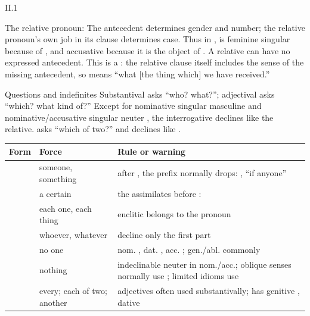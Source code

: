 \begin{courseunit}{II.1}
\begin{grammarbox}{The relative pronoun: }
The antecedent determines gender and number; the relative pronoun's own job in
its clause determines case. Thus in
,  is feminine singular because of
, and accusative because it is the object of .  A relative can
have no expressed antecedent. This is a : the relative
clause itself includes the sense of the missing antecedent, so  means ``what [the thing which] we have received.''
\end{grammarbox}

\begin{grammarbox}{Questions and indefinites}
Substantival  asks ``who? what?''; adjectival 
asks ``which? what kind of?''  Except for nominative singular masculine  and
nominative/accusative singular neuter , the interrogative declines like the
relative.   asks ``which of two?'' and declines like .

\begin{tabularx}{\linewidth}{@{}P{1.35in}Y Y@{}}
\toprule
\textbf{Form} & \textbf{Force} & \textbf{Rule or warning}\\ \midrule
{} & someone, something & after , the prefix
  normally drops: , ``if anyone''\\
 & a certain & the  assimilates before :
  \\
 & each one, each thing & enclitic  belongs to the pronoun\\
 & whoever, whatever & decline only the first part\\
 & no one & nom. , dat. , acc.
  ; gen./abl. commonly \\
 & nothing & indeclinable neuter in nom./acc.; oblique senses
  normally use ; limited idioms use
  \\
 & every; each of two; another & adjectives often used
  substantivally;  has genitive , dative \\
\bottomrule
\end{tabularx}


\end{grammarbox}
\end{courseunit}
